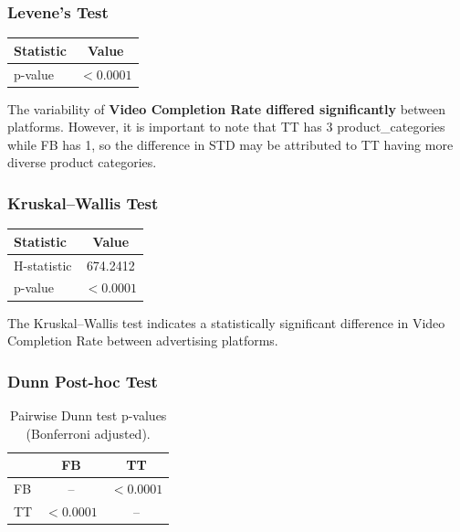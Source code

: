 \vspace{0.3cm}

\subsubsection{Levene's Test}

\begin{table}[H]
	\centering
	\begin{tabular}{lc}
		\toprule
		Statistic & Value \\
		\midrule
		p-value & $<0.0001$ \\
		\bottomrule
	\end{tabular}
\end{table}

The variability of \textbf{Video Completion Rate differed significantly} between platforms. However, it is important to note that TT has 3 product\_categories while FB has 1, so the difference in STD may be attributed to TT having more diverse product categories.

\vspace{0.3cm}

\subsubsection{Kruskal--Wallis Test}

\begin{table}[H]
	\centering
	\begin{tabular}{lc}
		\toprule
		Statistic & Value \\
		\midrule
		H-statistic & 674.2412 \\
		p-value & $<0.0001$ \\
		\bottomrule
	\end{tabular}
\end{table}

The Kruskal--Wallis test indicates a statistically significant difference in Video Completion Rate between advertising platforms.

\vspace{0.3cm}

\subsubsection{Dunn Post-hoc Test}

\begin{table}[H]
	\centering
	\caption{Pairwise Dunn test p-values (Bonferroni adjusted).}
	\begin{tabular}{lcc}
		\toprule
		& FB & TT \\
		\midrule
		FB & -- & $<0.0001$ \\
		TT & $<0.0001$ & -- \\
		\bottomrule
	\end{tabular}
\end{table}

